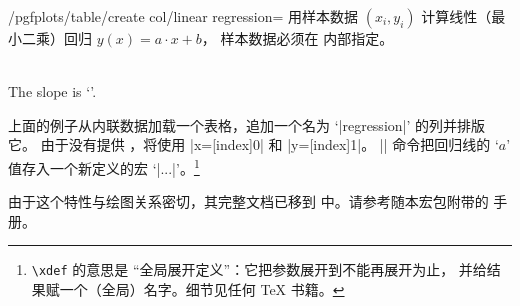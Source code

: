 \documentclass[a4paper,doc2]{ltxdoc}
\begin{document}
\begin{stylekey}{/pgfplots/table/create col/linear regression=}
    用样本数据 $(x_i,y_i)$ 计算线性（最小二乘）回归 $y(x) = a \cdot x + b$，
    样本数据必须在  内部指定。
\begin{codeexample}[pre={\vbox\bgroup\hsize=3cm},post=\egroup]
\loadedtbl

    {\loadedtbl}
\xdef\slope{\pgfplotstableregressiona}

\pgfplotstabletypeset\loadedtbl\\

The slope is `\slope'.
\end{codeexample}
    \noindent 上面的例子从内联数据加载一个表格，追加一个名为 `|regression|' 的列并排版它。
    由于没有提供 ，将使用 |x=[index]0| 和 |y=[index]1|。
    |\xdef\slope{...}| 命令把回归线的 `$a$' 值存入一个新定义的宏 `|\slope|'。\footnote{\texttt{\textbackslash xdef} 的意思是 ``全局展开定义''：它把参数展开到不能再展开为止，
    并给结果赋一个（全局）名字。细节见任何 \TeX{} 书籍。}

    由于这个特性与绘图关系密切，其完整文档已移到 \PGFPlots{} 中。请参考随本宏包附带的
    \PGFPlots{} 手册。
\end{stylekey}
\end{document}
